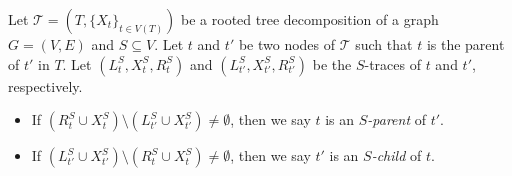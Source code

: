 \documentclass[a4paper,UKenglish,cleveref, autoref, thm-restate, numberwithinsect]{lipics-v2021}
\begin{document}
\begin{definition}\label{def:sparentchild}
Let $\mathcal{T}=(T,\{X_t\}_{t\in V(T)})$ be a rooted tree decomposition of a graph $G=(V,E)$ and $S\subseteq V$.
Let $t$ and $t'$ be two nodes of $\mathcal{T}$ such that $t$ is the parent of $t'$ in $T$. Let $(L_t^S, X_t^S, R_t^S)$ and $(L_{t'}^S, X_{t'}^S, R_{t'}^S)$ be the $S$-traces of $t$ and $t'$, respectively.
    \begin{itemize}
        \item If $(R_t^S \cup X_t^S)\setminus (L_{t'}^S \cup X_{t'}^S)\neq \emptyset$, then we say $t$ is an \emph{$S$-parent} of $t'$. 
        \item If $(L_{t'}^S \cup X_{t'}^S)\setminus (R_t^S \cup X_t^S) \neq \emptyset$, then we say $t'$ is an \emph{$S$-child} of $t$. 
    \end{itemize}
\end{definition}
\end{document}
